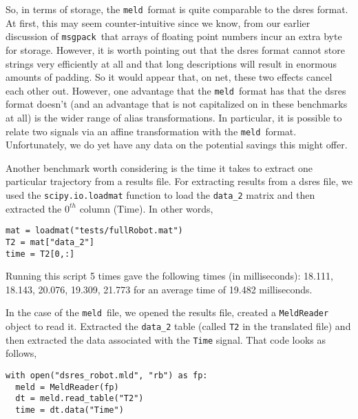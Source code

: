 \documentclass[11pt,a4paper,twocolumn]{article}
\newcommand{\meld}{\texttt{meld}}
\newcommand{\msgpack}{\texttt{msgpack}}
\newcommand{\code}[1]{\texttt{#1}} %
\begin{document}
So, in terms of storage, the \meld\ format is quite comparable to the
dsres format.  At first, this may seem counter-intuitive since we
know, from our earlier discussion of \msgpack\ that arrays of floating
point numbers incur an extra byte for storage.  However, it is worth
pointing out that the dsres format cannot store strings very
efficiently at all and that long descriptions will result in enormous
amounts of padding.  So it would appear that, on net, these two
effects cancel each other out.  However, one advantage that the
\meld\ format has that the dsres format doesn't (and an advantage that
is not capitalized on in these benchmarks at all) is the wider range
of alias transformations.  In particular, it is possible to relate two
signals via an affine transformation with the \meld\ format.
Unfortunately, we do yet have any data on the potential savings this
might offer.


Another benchmark worth considering is the time it takes to extract
one particular trajectory from a results file.  For extracting results
from a dsres file, we used the \code{scipy.io.loadmat} function to
load the \code{data\_2} matrix and then extracted the $0^{th}$ column
(Time).  In other words,

\begin{verbatim}
mat = loadmat("tests/fullRobot.mat")
T2 = mat["data_2"]
time = T2[0,:]
\end{verbatim}

Running this script 5 times gave the following times (in
milliseconds): 18.111, 18.143, 20.076, 19.309, 21.773 for an average time
of 19.482 milliseconds.

In the case of the \meld\ file, we opened the results file, created a
\code{MeldReader} object to read it.  Extracted the \code{data\_2}
table (called \code{T2} in the translated file) and then extracted the
data associated with the \code{Time} signal.  That code looks as
follows,

\begin{verbatim}
with open("dsres_robot.mld", "rb") as fp:
  meld = MeldReader(fp)
  dt = meld.read_table("T2")
  time = dt.data("Time")
\end{verbatim}
\end{document}

